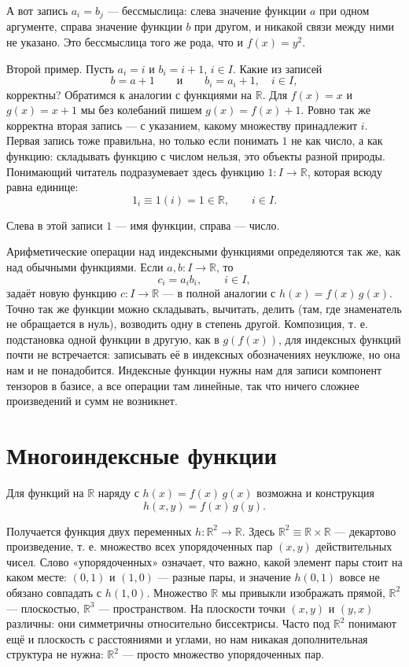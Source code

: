 \documentclass[11pt,a4paper]{article}
\begin{document}
А вот запись $a_i = b_j$ — бессмыслица: слева значение функции $a$ при одном аргументе, справа значение функции $b$ при другом, и никакой связи между ними не указано. Это бессмыслица того же рода, что и $f(x) = y^2$.

Второй пример. Пусть $a_i = i$ и $b_i = i + 1$, $i \in I$. Какие из записей
\[
b = a + 1 \qquad \text{и} \qquad b_i = a_i + 1, \quad i \in I,
\]
корректны? Обратимся к аналогии с функциями на $\mathbb{R}$. Для $f(x) = x$ и $g(x) = x + 1$ мы без колебаний пишем $g(x) = f(x) + 1$. Ровно так же корректна вторая запись — с указанием, какому множеству принадлежит $i$. Первая запись тоже правильна, но только если понимать $1$ не как число, а как функцию: складывать функцию с числом нельзя, это объекты разной природы. Понимающий читатель подразумевает здесь функцию $1\colon I \to \mathbb{R}$, которая всюду равна единице:
\[
1_i \equiv 1(i) = 1 \in \mathbb{R}, \qquad i \in I.
\]

Слева в этой записи $1$ — имя функции, справа — число.

Арифметические операции над индексными функциями определяются так же, как над обычными функциями. Если $a, b\colon I \to \mathbb{R}$, то
\[
c_i = a_i b_i, \qquad i \in I,
\]
задаёт новую функцию $c\colon I \to \mathbb{R}$ — в полной аналогии с $h(x) = f(x)\, g(x)$. Точно так же функции можно складывать, вычитать, делить (там, где знаменатель не обращается в нуль), возводить одну в степень другой. Композиция, т. е. подстановка одной функции в другую, как в $g(f(x))$, для индексных функций почти не встречается: записывать её в индексных обозначениях неуклюже, но она нам и не понадобится. Индексные функции нужны нам для записи компонент тензоров в базисе, а все операции там линейные, так что ничего сложнее произведений и сумм не возникнет.

\section{Многоиндексные функции}

Для функций на $\mathbb{R}$ наряду с $h(x) = f(x)\, g(x)$ возможна и конструкция
\[
h(x, y) = f(x)\, g(y).
\]

Получается функция двух переменных $h\colon \mathbb{R}^2 \to \mathbb{R}$. Здесь $\mathbb{R}^2 \equiv \mathbb{R} \times \mathbb{R}$ — декартово произведение, т. е. множество всех упорядоченных пар $(x, y)$ действительных чисел. Слово «упорядоченных» означает, что важно, какой элемент пары стоит на каком месте: $(0, 1)$ и $(1, 0)$ — разные пары, и значение $h(0, 1)$ вовсе не обязано совпадать с $h(1, 0)$. Множество $\mathbb{R}$ мы привыкли изображать прямой, $\mathbb{R}^2$ — плоскостью, $\mathbb{R}^3$ — пространством. На плоскости точки $(x, y)$ и $(y, x)$ различны: они симметричны относительно биссектрисы. Часто под $\mathbb{R}^2$ понимают ещё и плоскость с расстояниями и углами, но нам никакая дополнительная структура не нужна: $\mathbb{R}^2$ — просто множество упорядоченных пар.
\end{document}
